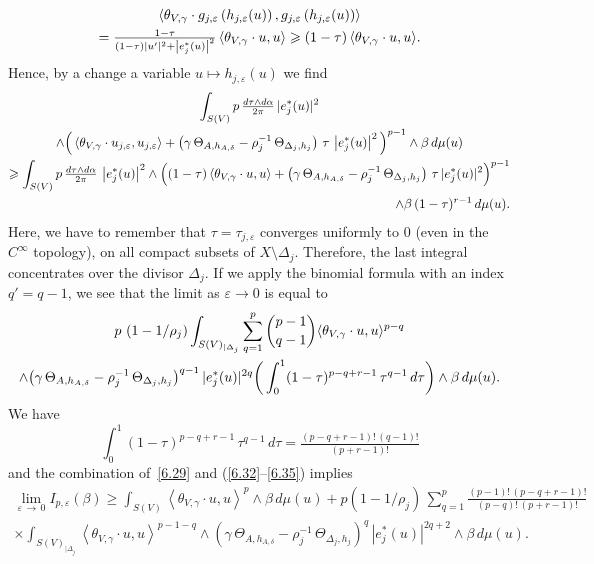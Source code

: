 \documentclass[AHL,Unicode,longabstracts,published]{cedram}
\DeclarePairedDelimiter{\abs}{\lvert}{\rvert}
\let\geq\geqslant
\begin{document}
\begin{multline*}
\left\langle\theta_{V,\gamma}\cdot g_{j,\varepsilon}\left(h_{j,\varepsilon}(u)\right),g_{j,\varepsilon}\left(h_{j,\varepsilon}(u)\right)
\right\rangle\\
=\tfrac{1-\tau}{ (1-\tau)\abs{u'}^2+\left|e_j^*(u)\right|^2}\,
\langle\theta_{V,\gamma}\cdot u,u\rangle
\geq(1-\tau)\,\langle\theta_{V,\gamma}\cdot u,u\rangle.
\end{multline*}
Hence, by a change a variable $u\mapsto h_{j,\varepsilon}(u)$ we find
\begin{multline}\label{6.33}
\int_{S(V)}p\,\tfrac{d\tau\wedge d\alpha}{ 2\pi}\,\abs{e_j^*(u)}^2\\
\wedge\Big(
\left\langle\theta_{V,\gamma}\cdot u_{j,\varepsilon},u_{j,\varepsilon}\right\rangle +\left(\gamma\,\Theta_{A,h_{A,\delta}}-\rho_j^{-1}\,\Theta_{\Delta_j,h_j}\right)
\,\tau\,\left|e_j^*(u)\right|^2\Big)^{p-1}
\wedge\beta\,d\mu(u)\\
\geq\int_{S(V)}p\,\tfrac{d\tau\wedge d\alpha}{2\pi}\,\left|e_j^*(u)\right|^2\wedge\Big((1-\tau)\left\langle\theta_{V,\gamma}\cdot u,u\right\rangle +\left(\gamma\,\Theta_{A,h_{A,\delta}}-\rho_j^{-1}\,\Theta_{\Delta_j,h_j}\right)
\,\tau\,\abs{e_j^*(u)}^2\Big)^{p-1}\\
\hfill\wedge\beta\,(1-\tau)^{r-1}\,d\mu(u).
\end{multline}
Here, we have to remember that $\tau=\tau_{j,\varepsilon}$ converges uniformly to $0$ (even in the $C^\infty$ topology), on all compact subsets of $X\setminus\Delta_j$. Therefore, the last integral concentrates over the divisor $\Delta_j$. If we apply the binomial formula with an index $q'=q-1$, we see that the limit as $\varepsilon\to 0$ is equal to
\begin{multline}\label{6.34}
p~(1-1/\rho_j)\int_{S(V)_{|\Delta_j}}\sum_{q=1}^{p}\binom{p-1}{ q-1}
\langle\theta_{V,\gamma}\cdot u,u\rangle^{p-q}\\
\wedge\big(\gamma\,\Theta_{A,h_{A,\delta}}-\rho_j^{-1}\,\Theta_{\Delta_j,h_j}\big)^{q-1}\,
\abs{e_j^*(u)}^{2q}
\bigg(\int_0^1(1-\tau)^{p-q+r-1}\,\tau^{q-1}\,d\tau\bigg)\wedge
\beta\,d\mu(u).
\end{multline}
We have
\begin{equation}\label{6.35}
\int_0^1(1-\tau)^{p-q+r-1}\,\tau^{q-1}\,d\tau=\tfrac{ (p-q+r-1)!\,(q-1)!}{ (p+r-1)!}
\end{equation}
and the combination of~\eqref{6.29} and (\eqref{6.32}--\eqref{6.35}) implies
\begin{multline}\label{6.36}
\lim_{\varepsilon\,\to\,0}I_{p,\varepsilon}(\beta)\ge
\int_{S(V)}\left\langle\theta_{V,\gamma}\cdot u,u\right\rangle^p\wedge\beta\,d\mu(u) +p(1-1/\rho_j)\,\sum_{q=1}^{p}\tfrac{(p-1)!\,(p-q+r-1)!}{ (p-q)!\,(p+r-1)!}\\
\times{}\int_{S(V)_{|\Delta_j}}
\left\langle\theta_{V,\gamma}\cdot u,u\right\rangle^{p-1-q}\wedge
\left(\gamma\,\Theta_{A,h_{A,\delta}}-\rho_j^{-1}\,\Theta_{\Delta_j,h_j}\right)^q\,
\left|e_j^*(u)\right|^{2q+2}\wedge\beta\,d\mu(u).
\end{multline}
\end{document}
